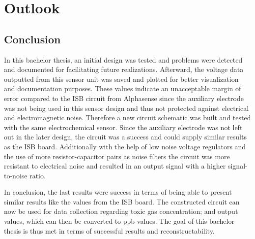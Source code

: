 \chapter{Outlook}
\label{sec:outlook}
\section{Conclusion}

In this bachelor thesis, an initial design was tested and problems were detected and documented for facilitating future realizations. Afterward, the voltage data outputted from this sensor unit was saved and plotted for better visualization and documentation purposes. These values indicate an unacceptable margin of error compared to the ISB circuit from Alphasense since the auxiliary electrode was not being used in this sensor design and thus not protected against electrical and electromagnetic noise. Therefore a new circuit schematic was built and tested with the same electrochemical sensor. Since the auxiliary electrode was not left out in the later design, the circuit was a success and could supply similar results as the ISB board. Additionally with the help of low noise voltage regulators and the use of more resistor-capacitor pairs as noise filters the circuit was more resistant to electrical noise and resulted in an output signal with a higher signal-to-noise ratio.\par 
In conclusion, the last results were success in terms of being able to present similar results like the values from the ISB board. The constructed circuit can now be used for data collection regarding toxic gas concentration; and output values, which can then be converted to ppb values. The goal of this bachelor thesis is thus met in terms of successful results and reconstructability. 


